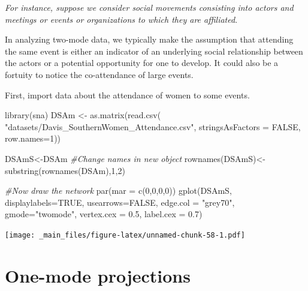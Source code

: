 \documentclass[
  notitlepage,
  onecolumn,
  openany]{book}
\newenvironment{Shaded}{\begin{snugshade}}{\end{snugshade}}
\newcommand{\AttributeTok}[1]{\textcolor[rgb]{0.77,0.63,0.00}{#1}}
\newcommand{\CommentTok}[1]{\textcolor[rgb]{0.56,0.35,0.01}{\textit{#1}}}
\newcommand{\ConstantTok}[1]{\textcolor[rgb]{0.00,0.00,0.00}{#1}}
\newcommand{\DecValTok}[1]{\textcolor[rgb]{0.00,0.00,0.81}{#1}}
\newcommand{\FloatTok}[1]{\textcolor[rgb]{0.00,0.00,0.81}{#1}}
\newcommand{\FunctionTok}[1]{\textcolor[rgb]{0.00,0.00,0.00}{#1}}
\newcommand{\NormalTok}[1]{#1}
\newcommand{\OtherTok}[1]{\textcolor[rgb]{0.56,0.35,0.01}{#1}}
\newcommand{\StringTok}[1]{\textcolor[rgb]{0.31,0.60,0.02}{#1}}
\begin{document}
\emph{For instance, suppose we consider social movements consisting into actors and meetings or events or organizations to which they are affiliated}.

In analyzing two-mode data, we typically make the assumption that attending the same event is either an indicator of an underlying social relationship between the actors or a potential opportunity for one to develop. It could also be a fortuity to notice the co-attendance of large events.

First, import data about the attendance of women to some events.

\begin{Shaded}
\begin{Highlighting}[]
\FunctionTok{library}\NormalTok{(sna)}
\NormalTok{DSAm }\OtherTok{\textless{}{-}} \FunctionTok{as.matrix}\NormalTok{(}\FunctionTok{read.csv}\NormalTok{(}
  \StringTok{"datasets/Davis\_SouthernWomen\_Attendance.csv"}\NormalTok{,}
  \AttributeTok{stringsAsFactors =} \ConstantTok{FALSE}\NormalTok{, }\AttributeTok{row.names=}\DecValTok{1}\NormalTok{))}

\NormalTok{DSAmS}\OtherTok{\textless{}{-}}\NormalTok{DSAm}
\CommentTok{\#Change names in new object}
\FunctionTok{rownames}\NormalTok{(DSAmS)}\OtherTok{\textless{}{-}}\FunctionTok{substring}\NormalTok{(}\FunctionTok{rownames}\NormalTok{(DSAm),}\DecValTok{1}\NormalTok{,}\DecValTok{2}\NormalTok{)}

\CommentTok{\#Now draw the network}
\FunctionTok{par}\NormalTok{(}\AttributeTok{mar =} \FunctionTok{c}\NormalTok{(}\DecValTok{0}\NormalTok{,}\DecValTok{0}\NormalTok{,}\DecValTok{0}\NormalTok{,}\DecValTok{0}\NormalTok{))}
\FunctionTok{gplot}\NormalTok{(DSAmS, }
      \AttributeTok{displaylabels=}\ConstantTok{TRUE}\NormalTok{, }
      \AttributeTok{usearrows=}\ConstantTok{FALSE}\NormalTok{, }
      \AttributeTok{edge.col =} \StringTok{"grey70"}\NormalTok{,}
      \AttributeTok{gmode=}\StringTok{"twomode"}\NormalTok{,}
      \AttributeTok{vertex.cex =} \FloatTok{0.5}\NormalTok{,}
      \AttributeTok{label.cex =} \FloatTok{0.7}\NormalTok{)}
\end{Highlighting}
\end{Shaded}

\texttt{[image: \_main\_files/figure-latex/unnamed-chunk-58-1.pdf]}

\hypertarget{one-mode-projections}{%
\section{One-mode projections}\label{one-mode-projections}}
\end{document}
